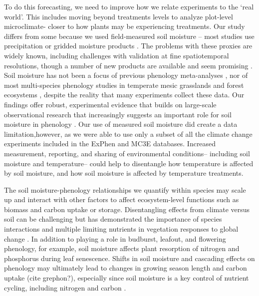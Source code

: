 \documentclass{article}
\begin{document}
\par To do this forecasting, we need to improve how we relate experiments to the `real world'. This includes moving beyond treatments levels to analyze plot-level microclimate- closer to how plants may be experiencing treatments. Our study differs from some because we used field-measured soil moisture -- most studies use precipitation \citep[e.g.,][]{tao2020} or gridded moisture products \citep[e.g.,][]{tao2019}. The problems with these proxies are widely known, including challenges with validation at fine spatiotemporal resolutions, though a number of new products are available and seem promising \citep{peng2021roadmap,brocca2024exploring}. Soil moisture has not been a focus of previous phenology meta-analyses \cite[e.g.,][]{wolkovich2012}, nor of most multi-species phenology studies in temperate mesic grasslands and forest ecosystems \cite[e.g.,][]{Vitass2021}, despite the reality that many experiments collect these data.
Our findings offer robust, experimental evidence that builds on large-scale observational research that increasingly suggests an important role for soil moisture in phenology \cite[e.g.,][]{}. Our use of measured soil moisture did create a data limitation,however, as we were able to use only a subset of all the climate change experiments included in the ExPhen and MC3E databases. Increased measurement, reporting, and sharing of environmental conditions-- including soil moisture and temperature-- could help to disentangle how temperature is affected by soil moisture, and how soil moisture is affected by temperature treatments.

\par The soil moisture-phenology relationships we quantify within species may scale up and interact with other factors to affect ecosystem-level functions such as biomass and carbon uptake or storage. Disentangling effects from climate versus soil can be challenging but has demonstrated the importance of species interactions and multiple limiting nutrients in vegetation responses to global change \citep{wilfahrt2021}. In addition to playing a role in  budburst, leafout, and flowering phenology, for example, soil moisture affects plant resorption of nitrogen and phosphorus during leaf senescence\citep{estiarte2022}. Shifts in soil moisture and cascading effects on phenology may ultimately lead to changes in growing season length and carbon uptake (cite grephon?), especially since soil moisture is a key control of nutrient cycling, including nitrogen and carbon \citep{liu2019soil}.
\end{document}
